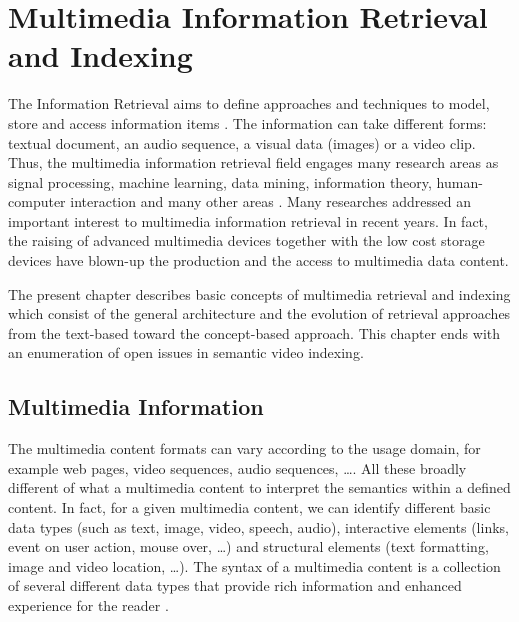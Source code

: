 \chapter{Multimedia Information Retrieval and Indexing}
\label{state1}
	
	The Information Retrieval aims to define approaches and techniques to model, store and 
	access information items \citep{Baeza-Yates2011}.
	The information can take different forms: textual document, an audio sequence, a visual 
	data (images) or a video clip. Thus, the multimedia information retrieval 
	field engages many research areas as signal processing, 
	machine learning, data mining, information theory, human-computer interaction and many other 
	areas \citep{Rueger2010,Sheu2010}. Many researches  addressed an important interest to multimedia 
	information retrieval in recent years. In fact, the raising of advanced multimedia devices 
	together with the low cost storage devices have blown-up the production and the 
	access to multimedia data content.

	The present chapter describes basic concepts of multimedia retrieval and indexing which consist of the 
	general architecture and the evolution of retrieval approaches from the text-based toward the concept-based 
	approach. This chapter ends with an enumeration of open issues in semantic video indexing.

	\section{Multimedia Information}

	The multimedia content formats can vary 
	according to the usage domain, for example web pages, video sequences, audio sequences, \dots{}. 
	All these broadly different  of what a multimedia content  to interpret the 
	semantics within a defined content. In fact, for a given multimedia content, we can identify different
	basic data types (such as text, image, video, speech, audio), interactive elements 
	(links, event on user action, mouse over, \dots{}) and structural elements (text formatting, image and 
	video location, \dots{}). The syntax of a multimedia content is a collection of several different  data 
	types that provide rich information and enhanced experience for the reader \citep{Stamou2005}.

